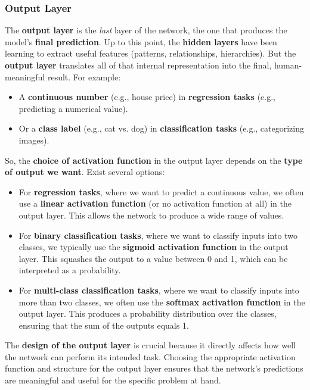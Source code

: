 \subsubsection{Output Layer}

The \textbf{output layer} is the \emph{last} layer of the network, the one that produces the model's \textbf{final prediction}. Up to this point, the \textbf{hidden layers} have been learning to extract useful features (patterns, relationships, hierarchies). But the \textbf{output layer} translates all of that internal representation into the final, human-meaningful result. For example:
\begin{itemize}
    \item A \textbf{continuous number} (e.g., house price) in \textbf{regression tasks} (e.g., predicting a numerical value).
    \item Or a \textbf{class label} (e.g., cat vs. dog) in \textbf{classification tasks} (e.g., categorizing images).
\end{itemize}
So, the \textbf{choice of activation function} in the output layer depends on the \textbf{type of output we want}. Exist several options:
\begin{itemize}
    \item For \textbf{regression tasks}, where we want to predict a continuous value, we often use a \textbf{linear activation function} (or no activation function at all) in the output layer. This allows the network to produce a wide range of values.
    \item For \textbf{binary classification tasks}, where we want to classify inputs into two classes, we typically use the \textbf{sigmoid activation function} in the output layer. This squashes the output to a value between 0 and 1, which can be interpreted as a probability.
    \item For \textbf{multi-class classification tasks}, where we want to classify inputs into more than two classes, we often use the \textbf{softmax activation function} in the output layer. This produces a probability distribution over the classes, ensuring that the sum of the outputs equals 1.
\end{itemize}
The \textbf{design of the output layer} is crucial because it directly affects how well the network can perform its intended task. Choosing the appropriate activation function and structure for the output layer ensures that the network's predictions are meaningful and useful for the specific problem at hand.

